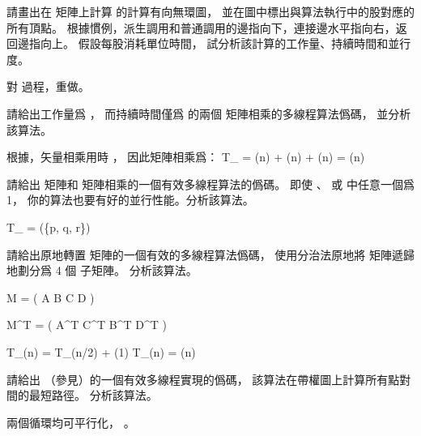 \startsection[
  title={Multithreadedmatrix multiplication},
]

\startEXERCISE[exercise:27.2-1]
請畫出在  矩陣上計算  的計算有向無環圖，
並在圖中標出與算法執行中的股對應的所有頂點。
根據慣例，派生調用和普通調用的邊指向下，連接邊水平指向右，返回邊指向上。
假設每股消耗單位時間，
試分析該計算的工作量、持續時間和並行度。
\stopEXERCISE

\startANSWER
\externalfigure[output/e27_2_1-1]
\stopANSWER

\startEXERCISE
對  過程，重做。
\stopEXERCISE

\startANSWER
{}
\stopANSWER

\startEXERCISE
請給出工作量爲 ，
而持續時間僅爲  的兩個  矩陣相乘的多線程算法僞碼，
並分析該算法。
\stopEXERCISE

\startANSWER
根據，矢量相乘用時 ，
因此矩陣相乘爲：
\startformula
T_{\infty} = \Theta(\lg n) + \Theta(\lg n) + \Theta(\lg n) = \Theta(\lg n)
\stopformula
\stopANSWER

\startEXERCISE
請給出  矩陣和  矩陣相乘的一個有效多線程算法的僞碼。
即使 、  或  中任意一個爲 1，
你的算法也要有好的並行性能。分析該算法。
\stopEXERCISE

\startANSWER
\startformula
T_{\infty} = \Theta(\min\{\lg p, \lg q, \lg r\})
\stopformula
\stopANSWER

\startEXERCISE
請給出原地轉置  矩陣的一個有效的多線程算法僞碼，
使用分治法原地將  矩陣遞歸地劃分爲 4 個  子矩陣。
分析該算法。
\stopEXERCISE

\startANSWER
\startformula
M = \left(\startmatrix
\NC A \NC B \NR
\NC C \NC D \NR
\stopmatrix\right)
\stopformula

\startformula
M^T = \left(\startmatrix
\NC A^T \NC C^T \NR
\NC B^T \NC D^T \NR
\stopmatrix\right)
\stopformula

\startformula\startmathalignment
\NC T_{\infty}(n) \NC = T_{\infty}(n/2) + \Theta(1) \NR
\NC T_{\infty}(n) \NC = \Theta(\lg n) \NR
\stopmathalignment\stopformula
\stopANSWER

\startEXERCISE
請給出  （參見）的一個有效多線程實現的僞碼，
該算法在帶權圖上計算所有點對間的最短路徑。
分析該算法。
\stopEXERCISE

\startANSWER
兩個循環均可平行化， 。
\stopANSWER

\stopsection
